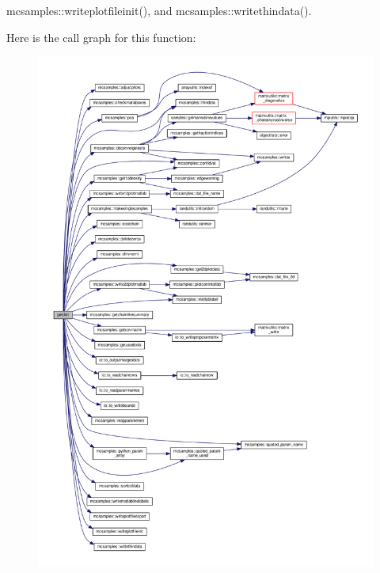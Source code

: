 mcsamples\+::writeplotfileinit(), and mcsamples\+::writethindata().

Here is the call graph for this function\+:
\nopagebreak
\begin{figure}[H]
\begin{center}
\leavevmode
\includegraphics[width=350pt]{GetDist_8f90_a78c185cfd3ac27937ede022b24ae72e9_cgraph}
\end{center}
\end{figure}
